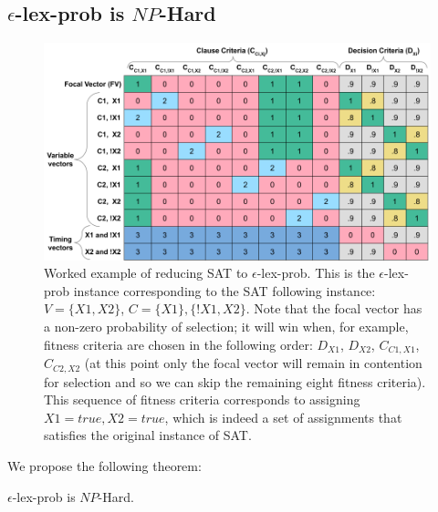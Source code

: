 \documentclass[sigconf]{acmart}
\begin{document}

\subsection{{\sc $\epsilon$-lex-prob} is $NP$-Hard}

\begin{figure}
    \centering
    \includegraphics[width=\linewidth]{figs/SAT_to_eps_example.png}
    \caption{Worked example of reducing {\sc SAT} to {\sc $\epsilon$-lex-prob}. This is the {\sc $\epsilon$-lex-prob} instance corresponding to the {\sc SAT} following instance: $V = \{X1, X2\}$, $C = \{X1\}, \{!X1, X2\}$. Note that the focal vector has a non-zero probability of selection; it will win when, for example, fitness criteria are chosen in the following order: $D_{X1}$, $D_{X2}$, $C_{C1,X1}$, $C_{C2,X2}$ (at this point only the focal vector will remain in contention for selection and so we can skip the remaining eight fitness criteria). This sequence of fitness criteria corresponds to assigning $X1=true, X2=true$, which is indeed a set of assignments that satisfies the original instance of {\sc SAT}. }
    \label{fig:sat_to_eps}
\end{figure}

We propose the following theorem:

\begin{theorem}
\label{elexicasetheorem}
{\sc $\epsilon$-lex-prob} is $NP$-Hard.
\end{theorem}
\end{document}

